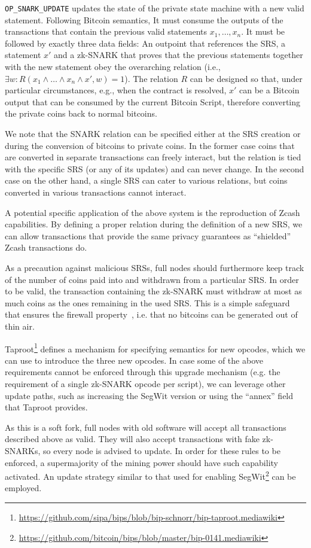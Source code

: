   \texttt{OP\_SNARK\_UPDATE} updates the state of the private state machine with
  a new valid statement. Following Bitcoin semantics, It must consume the
  outputs of the transactions that contain the previous valid statements $x_1,
  \dots, x_n$. It must be followed by exactly three data fields: An outpoint
  that references the SRS, a statement $x'$ and a zk-SNARK that proves that the
  previous statements together with the new statement obey the overarching
  relation (i.e., $\exists w: R(x_1 \wedge \dots \wedge x_n \wedge x', w) = 1$).
  The relation $R$ can be designed so that, under particular circumstances,
  e.g., when the contract is resolved, $x'$ can be a Bitcoin output that can be
  consumed by the current Bitcoin Script, therefore converting the private coins
  back to normal bitcoins.

  We note that the SNARK relation can be specified either at the SRS creation or
  during the conversion of bitcoins to private coins. In the former case coins
  that are converted in separate transactions can freely interact, but the
  relation is tied with the specific SRS (or any of its updates) and can never
  change. In the second case on the other hand, a single SRS can cater to
  various relations, but coins converted in various transactions cannot
  interact.

  A potential specific application of the above system is the reproduction of
  Zcash~\cite{DBLP:conf/sp/Ben-SassonCG0MTV14,zcash-protocol} capabilities. By
  defining a proper relation during the definition of a new SRS, we can allow
  transactions that provide the same privacy guarantees as ``shielded'' Zcash
  transactions do.

  As a precaution against malicious SRSs, full nodes should furthermore keep
  track of the number of coins paid into and withdrawn from a particular SRS. In
  order to be valid, the transaction containing the zk-SNARK must withdraw at
  most as much coins as the ones remaining in the used SRS. This is a simple
  safeguard that ensures the firewall property~\cite{DBLP:conf/sp/GaziKZ19},
  i.e. that no bitcoins can be generated out of thin air.

  Taproot\footnote{\url{https://github.com/sipa/bips/blob/bip-schnorr/bip-taproot.mediawiki}}
  defines a mechanism for specifying semantics for new opcodes, which we can use
  to introduce the three new opcodes. In case some of the above requirements
  cannot be enforced through this upgrade mechanism (e.g. the requirement of a
  single zk-SNARK opcode per script), we can leverage other update paths, such
  as increasing the SegWit version or using the ``annex'' field that Taproot
  provides.

  As this is a soft fork, full nodes with old software will accept all
  transactions described above as valid. They will also accept transactions with
  fake zk-SNARKs, so every node is advised to update. In order for these rules
  to be enforced, a supermajority of the mining power should have such
  capability activated. An update strategy similar to that used for enabling
  SegWit\footnote{\url{https://github.com/bitcoin/bips/blob/master/bip-0141.mediawiki}}
  can be employed.

